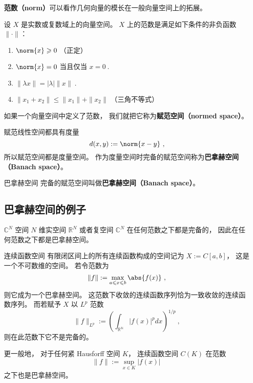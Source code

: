 

\textbf{范数（norm）}可以看作几何向量的模长在一般向量空间上的拓展。
\begin{definition}{}
设 $X$ 是实数或复数域上的向量空间。 $X$ 上的范数是满足如下条件的非负函数 $\|\cdot\|$：
\begin{enumerate}
\item $\norm{x} \geqslant 0$ （正定）
\item $\norm{x} = 0$ 当且仅当 $x = 0~.$
\item $\|\lambda x\| = |\lambda|\|x\|~.$
\item $\|x_1+x_2\| \leqslant \|x_1\|+ \|x_2\|$ （三角不等式）
\end{enumerate}
如果一个向量空间中定义了范数， 我们就把它称为\textbf{赋范空间（normed space）}。
\end{definition}

赋范线性空间都具有度量
\begin{equation}
d(x,y) := \norm{x-y}~,
\end{equation}
所以赋范空间都是度量空间。 作为度量空间时完备的赋范空间称为\textbf{巴拿赫空间（Banach space）}。

\begin{definition}{巴拿赫空间}
完备的赋范空间叫做\textbf{巴拿赫空间（Banach space）}。
\end{definition}

\subsection{巴拿赫空间的例子}
\begin{example}{$\mathbb C^N$ 空间}
$N$ 维实空间 $\mathbb R^N$ 或者复空间 $\mathbb C^N$ 在任何范数之下都是完备的， 因此在任何范数之下都是巴拿赫空间。
\end{example}

\begin{example}{连续函数空间}
有限闭区间上的所有连续函数构成的空间记为 $X := C[a, b]$， 这是一个不可数维的空间。 若令范数为
$$
\|{f}\|:= \max_{a \leqslant x \leqslant b} \abs{f(x)}~,
$$
则它成为一个巴拿赫空间。 这范数下收敛的连续函数序列恰为一致收敛的连续函数序列。 而若赋予 $X$ 以 $L^p$ 范数
$$
\|f\|_{L^p}:=\left(\int_{\mathbb{R^N}}|f(x)|^pdx\right)^{1/p}~,
$$
则在此范数下它不是完备的。

更一般地， 对于任何紧 Hausforff 空间 $K$， 连续函数空间 $C(K)$ 在范数
$$
\|f\|:=\sup_{x\in K}|f(x)|~
$$
之下也是巴拿赫空间。
\end{example}

